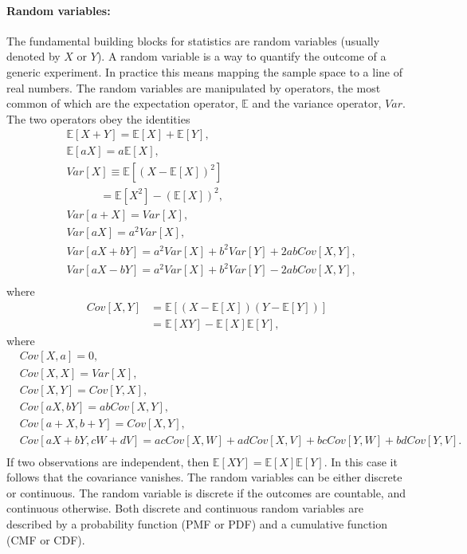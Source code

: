 \paragraph{Random variables:}
The fundamental building blocks for statistics are random variables (usually denoted by $X$ or $Y$). A random variable is a way to quantify the outcome of a generic experiment. In practice this means mapping the sample space to a line of real numbers. The random variables are manipulated by operators, the most common of which are the expectation operator, $\mathbb{E}$ and the variance operator, $Var$. The two operators obey the identities
\begin{equation}
	\begin{split}
		&\mathbb{E}[X+Y]=\mathbb{E}[X]+\mathbb{E}[Y],\\
		&\mathbb{E}[aX]=a\mathbb{E}[X],\\
		&Var[X]\equiv \mathbb{E}[(X-\mathbb{E}[X])^2]\\
		&\qquad\quad=\mathbb{E}[X^2]-(\mathbb{E}[X])^2,\\
		&Var[a+X]=Var[X],\\
		&Var[aX]=a^2Var[X],\\
		&Var[aX+bY]=a^2Var[X]+b^2Var[Y]+2abCov[X,Y],\\
		&Var[aX-bY]=a^2Var[X]+b^2Var[Y]-2abCov[X,Y],\\
	\end{split}
\end{equation}
where
\begin{equation}
	\begin{split}
		Cov[X,Y]&=\mathbb{E}[(X-\mathbb{E}[X])(Y-\mathbb{E}[Y])]\\
		&=\mathbb{E}[XY]-\mathbb{E}[X]\mathbb{E}[Y],
	\end{split}
\end{equation}
where
\begin{equation}
	\begin{split}
		&Cov[X,a]=0,\\
		&Cov[X,X]=Var[X],\\
		&Cov[X,Y]=Cov[Y,X],\\
		&Cov[aX,bY]=abCov[X,Y],\\
		&Cov[a+X,b+Y]=Cov[X,Y],\\
		&Cov[aX+bY,cW+dV]=acCov[X,W]+adCov[X,V]+bcCov[Y,W]+bdCov[Y,V].\\
	\end{split}
\end{equation}
If two observations are independent, then $\mathbb{E}[XY]=\mathbb{E}[X]\mathbb{E}[Y]$. In this case it follows that the covariance vanishes. \newline\newline
The random variables can be either discrete or continuous. The random variable is discrete if the outcomes are countable, and continuous otherwise. Both discrete and continuous random variables are described by a probability function (PMF or PDF) and a cumulative function (CMF or CDF).

